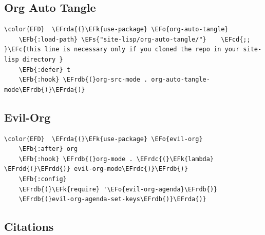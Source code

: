 \documentclass[11pt]{article}
\newcommand{\EFc}[1]{\textcolor{EFc}{#1}} %
\newcommand{\EFcd}[1]{\textcolor{EFcd}{#1}} %
\newcommand{\EFs}[1]{\textcolor{EFs}{#1}} %
\newcommand{\EFk}[1]{\textcolor{EFk}{#1}} %
\newcommand{\EFb}[1]{\textcolor{EFb}{#1}} %
\newcommand{\EFo}[1]{\textcolor{EFo}{#1}} %
\newcommand{\EFrda}[1]{\textcolor{EFrda}{#1}} %
\newcommand{\EFrdb}[1]{\textcolor{EFrdb}{#1}} %
\newcommand{\EFrdc}[1]{\textcolor{EFrdc}{#1}} %
\newcommand{\EFrdd}[1]{\textcolor{EFrdd}{#1}} %
\begin{document}
\subsection{Org Auto Tangle}
\label{sec:orgbcf1290}
\begin{Code}
\begin{Verbatim}
\color{EFD}  \EFrda{(}\EFk{use-package} \EFo{org-auto-tangle}
    \EFb{:load-path} \EFs{"site-lisp/org-auto-tangle/"}    \EFcd{;; }\EFc{this line is necessary only if you cloned the repo in your site-lisp directory }
    \EFb{:defer} t
    \EFb{:hook} \EFrdb{(}org-src-mode . org-auto-tangle-mode\EFrdb{)}\EFrda{)}
\end{Verbatim}
\end{Code}
\subsection{Evil-Org}
\label{sec:orge8173b1}
\begin{Code}
\begin{Verbatim}
\color{EFD}  \EFrda{(}\EFk{use-package} \EFo{evil-org}
    \EFb{:after} org
    \EFb{:hook} \EFrdb{(}org-mode . \EFrdc{(}\EFk{lambda} \EFrdd{(}\EFrdd{)} evil-org-mode\EFrdc{)}\EFrdb{)}
    \EFb{:config}
    \EFrdb{(}\EFk{require} '\EFo{evil-org-agenda}\EFrdb{)}
    \EFrdb{(}evil-org-agenda-set-keys\EFrdb{)}\EFrda{)}
\end{Verbatim}
\end{Code}

\subsection{Citations}
\label{sec:org6166baf}
\end{document}
